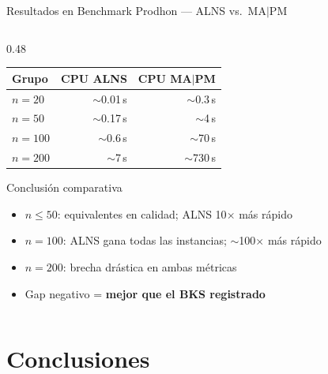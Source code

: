 \documentclass[aspectratio=169,10pt]{beamer}
\begin{document}
\begin{frame}{Resultados en Benchmark Prodhon --- ALNS vs.\ MA$|$PM}
\begin{columns}[T,onlytextwidth]
\begin{column}{0.48\textwidth}
\begin{center}
\begin{tabular}{lrr}
        \toprule
        Grupo & CPU ALNS & CPU MA$|$PM \\
        \midrule
        $n=20$  & $\sim$0.01\,s & $\sim$0.3\,s \\
        $n=50$  & $\sim$0.17\,s & $\sim$4\,s   \\
        $n=100$ & $\sim$0.6\,s  & $\sim$70\,s  \\
        $n=200$ & $\sim$7\,s    & $\sim$730\,s \\
        \bottomrule
      \end{tabular}
      \end{center}
      \vspace{0.3em}
      \begin{block}{Conclusión comparativa}\small
        \begin{itemize}
          \item $n \le 50$: equivalentes en calidad; ALNS 10$\times$ más rápido
          \item $n=100$: ALNS gana todas las instancias; $\sim$100$\times$ más rápido
          \item $n=200$: brecha drástica en ambas métricas
          \item Gap negativo = \textbf{mejor que el BKS registrado}
        \end{itemize}
      \end{block}
    \end{column}
  \end{columns}
\end{frame}

\section{Conclusiones}
\end{document}
